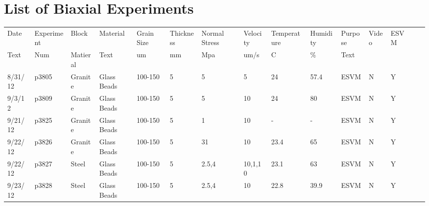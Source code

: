 \chapter{List of Biaxial Experiments}

\begin{landscape}
\begin{longtable}{lllllllllllllll}
Date     & Experiment & Block            & Material     & Grain Size   & Thickness & Normal Stress & Velocity                     & Temperature & Humidity & Purpose                                         & Video & ESVM &  &  \\
Text     & Num        & Matieral         & Text         & um           & mm        & Mpa           & um/s                         & C           & \%       & Text                                            &       &      &  &  \\
\hline
\hline
8/31/12  & p3805      & Granite          & Glass Beads  & 100-150      & 5         & 5             & 5                           & 24          & 57.4     & ESVM                                            & N     & Y    &  &  \\
9/3/12   & p3809      & Granite          & Glass Beads  & 100-150      & 5         & 5             & 10                           & 24          & 80       & ESVM                                            & N     & Y    &  &  \\
9/21/12  & p3825      & Granite          & Glass Beads  & 100-150      & 5         & 1             & 10                           & -           & -        & ESVM                                            & N     & Y    &  &  \\
9/22/12  & p3826      & Granite          & Glass Beads  & 100-150      & 5         & 31            & 10                           & 23.4        & 65       & ESVM                                            & N     & Y    &  &  \\
9/22/12  & p3827      & Steel            & Glass Beads  & 100-150      & 5         & 2.5,4         & 10,1,10                      & 23.1        & 63       & ESVM                                            & N     & Y    &  &  \\
9/23/12  & p3828      & Steel            & Glass Beads  & 100-150      & 5         & 2.5,4         & 10                           & 22.8        & 39.9     & ESVM                                            & N     & Y    &  &  \\

\end{longtable}
\end{landscape}
